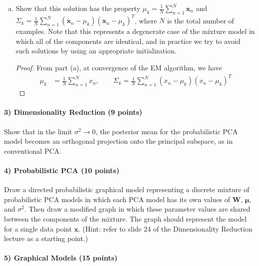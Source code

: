 \documentclass{article}
\begin{document}
\begin{enumerate}[(a)]
	\item Show that this solution has the property $\mu_k=\frac{1}{N}\sum_{n=1}^{N}\mathbf{x}_n$ and $\Sigma_k=\frac{1}{N}\sum_{n=1}^{N}(\mathbf{x}_n-\mu_k)(\mathbf{x}_n-\mu_k)^T$, where $N$ is the total number of examples. Note that this represents a degenerate case of the mixture model in which all of the components are identical, and in practice we try to avoid such solutions by using an appropriate initialization.
		\begin{proof}
			From part (a), at convergence of the EM algorithm, we have
			\begin{align*}
				\mu_k &= \frac{1}{N}\sum_{n=1}^{N} x_n, \quad\quad \Sigma_k = \frac{1}{N} \sum_{n=1}^{N} \left( x_n-\mu_k \right)\left( x_n-\mu_k \right)^T
			\end{align*}
		\end{proof}

\end{enumerate}

\paragraph{3) Dimensionality Reduction (9 points)}

Show that in the limit $\sigma^2 \rightarrow 0$, the posterior mean for the probabilistic PCA model becomes an orthogonal projection onto the principal subspace, as in conventional PCA.


\paragraph{4) Probabilistic PCA (10 points)}

Draw a directed probabilistic graphical model representing a discrete mixture of probabilistic PCA models in which each PCA model has its own values of $\mathbf{W}$, $\boldsymbol{\mu}$, and $\sigma^2$. Then draw a modified graph in which these parameter values are shared between the components of the mixture. The graph should represent the model for a single data point $\mathbf{x}$. (Hint: refer to slide 24 of the Dimensionality Reduction lecture as a starting point.)


\paragraph{5) Graphical Models (15 points)}
\end{document}
